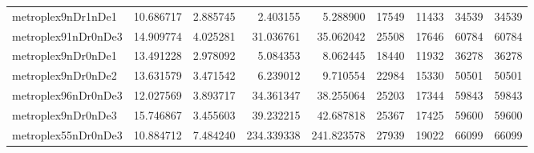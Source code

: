 \begin{longtable}{|l|r|r|r|r|r|r|r|r|}
metroplex9nDr1nDe1 & 10.686717 & 2.885745 & 2.403155 & 5.288900 & 17549 & 11433 & 34539 & 34539 \\
metroplex91nDr0nDe3 & 14.909774 & 4.025281 & 31.036761 & 35.062042 & 25508 & 17646 & 60784 & 60784 \\
metroplex9nDr0nDe1 & 13.491228 & 2.978092 & 5.084353 & 8.062445 & 18440 & 11932 & 36278 & 36278 \\
metroplex9nDr0nDe2 & 13.631579 & 3.471542 & 6.239012 & 9.710554 & 22984 & 15330 & 50501 & 50501 \\
metroplex96nDr0nDe3 & 12.027569 & 3.893717 & 34.361347 & 38.255064 & 25203 & 17344 & 59843 & 59843 \\
metroplex9nDr0nDe3 & 15.746867 & 3.455603 & 39.232215 & 42.687818 & 25367 & 17425 & 59600 & 59600 \\
metroplex55nDr0nDe3 & 10.884712 & 7.484240 & 234.339338 & 241.823578 & 27939 & 19022 & 66099 & 66099 \\
\end{longtable}
